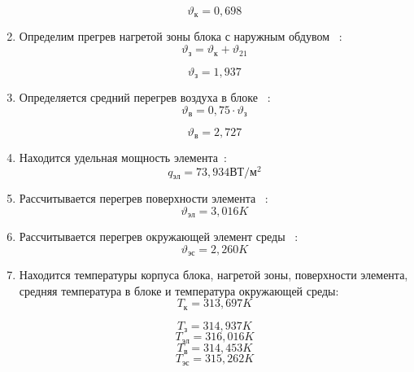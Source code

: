 \begin{enumerate}[label={\arabic*.}]
$$\vartheta\mathrm{_к} = 0,698$$

\item Определим прегрев нагретой зоны блока с наружным обдувом
  ~\cite{Rotkop1976}:
  \begin{equation}
    \vartheta\mathrm{_з} =  \vartheta\mathrm{_к} + \vartheta_{21}
    \end{equation}
  
$$\vartheta\mathrm{_з} = 1,937$$

\item Определяется средний перегрев воздуха в блоке ~\cite{Rotkop1976}:
  \begin{equation}
    \vartheta\mathrm{_в} = 0,75 \cdot \vartheta\mathrm{_з}
  \end{equation}

  $$\vartheta\mathrm{_в} = 2,727$$
  \item Находится удельная мощность элемента~\cite{Rotkop1976}:
  $$q\mathrm{_{эл}} =73,934\mathrm{ВТ/м^2} $$
\item Рассчитывается перегрев поверхности элемента ~\cite{Rotkop1976}:
  $$\vartheta\mathrm{_{эл}} =3,016K$$

\item Рассчитывается перегрев окружающей элемент среды ~\cite{Rotkop1976}:
  $$\vartheta\mathrm{_{эс}} = 2,260K$$

\item Находится температуры корпуса блока, нагретой зоны, поверхности
  элемента, средняя температура в блоке и температура окружающей среды:
  $$T\mathrm{_{к}} = 313,697 K$$
  
    $$T\mathrm{_з} = 314,937 K$$
    $$T\mathrm{_{эл}} = 316,016 K$$
    $$T\mathrm{_{в}} = 314,453 K$$
    $$T\mathrm{_{эс}} =315,262 K$$

\end{enumerate}

